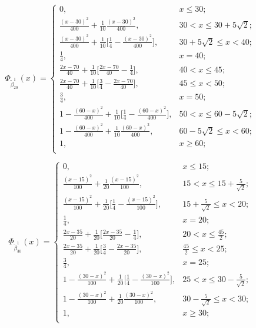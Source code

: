 \[\Phi_{\tilde{\beta}_{20}^1}(x)=\left\{
\begin{array}{ll}
	0, & x\leq 30;\\
	\frac{(x-30)^2}{400}+\frac{1}{10}\frac{(x-30)^2}{400}, & 30<x\leq 30+5\sqrt{2};\\
	\frac{(x-30)^2}{400}+\frac{1}{10}\big[\frac{1}{4}-\frac{(x-30)^2}{400}\big], & 30+5\sqrt{2}\leq x<40;\\
	\frac{1}{4}, & x=40;\\
	\frac{2x-70}{40}+\frac{1}{10}\big[\frac{2x-70}{40}-\frac{1}{4}\big], & 40< x\leq 45;\\
	\frac{2x-70}{40}+\frac{1}{10}\big[\frac{3}{4}-\frac{2x-70}{40}\big], & 45\leq x<50;\\
	\frac{3}{4}, & x=50;\\
	1-\frac{(60-x)^2}{400}+\frac{1}{10}\big[\frac{1}{4}-\frac{(60-x)^2}{400}\big], & 50<x\leq 60-5\sqrt{2};\\
	1-\frac{(60-x)^2}{400}+\frac{1}{10}\frac{(60-x)^2}{400}, &  60-5\sqrt{2}\leq x<60;\\
	1, & x\geq 60;\\
\end{array}
\right.
\]

\[\Phi_{\tilde{\beta}_{30}^1}(x)=\left\{
\begin{array}{ll}
	0, & x\leq 15;\\
	\frac{(x-15)^2}{100}+\frac{1}{20}\frac{(x-15)^2}{100}, & 15<x\leq 15+\frac{5}{\sqrt{2}};\\
	\frac{(x-15)^2}{100}+\frac{1}{20}\big[\frac{1}{4}-\frac{(x-15)^2}{100}\big], & 15+\frac{5}{\sqrt{2}}\leq x<20;\\
	\frac{1}{4}, & x=20;\\
	\frac{2x-35}{20}+\frac{1}{20}\big[\frac{2x-35}{20}-\frac{1}{4}\big], & 20< x\leq \frac{45}{2};\\
	\frac{2x-35}{20}+\frac{1}{20}\big[\frac{3}{4}-\frac{2x-35}{20}\big], & \frac{45}{2}\leq x<25;\\
	\frac{3}{4}, & x=25;\\
	1-\frac{(30-x)^2}{100}+\frac{1}{20}\big[\frac{1}{4}-\frac{(30-x)^2}{100}\big], & 25<x\leq 30-\frac{5}{\sqrt{2}};\\
	1-\frac{(30-x)^2}{100}+\frac{1}{20}\frac{(30-x)^2}{100}, &  30-\frac{5}{\sqrt{2}}\leq x<30;\\
	1, & x\geq 30;\\
\end{array}
\right.
\]

